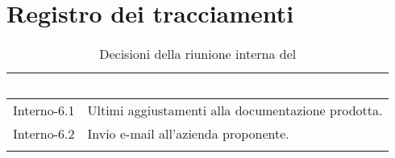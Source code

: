 \section{Registro dei tracciamenti}
{
\renewcommand{\arraystretch}{1.5}
\centering
\begin{longtable}{C{3cm} C{9cm}}
\textcolor{white}{\textbf{Codice}}&
\textcolor{white}{\textbf{Decisione}}\\	

\endhead
		
Interno-6.1 & Ultimi aggiustamenti alla documentazione prodotta.\\
Interno-6.2 & Invio e-mail all'azienda proponente.\\
\caption{Decisioni della riunione interna del \Data{}}
\end{longtable}
}
